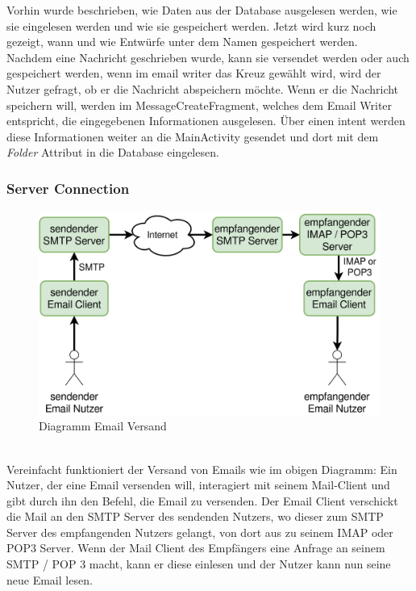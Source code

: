 \documentclass[a4paper,11pt]{article}
\begin{document}

\nohyphenation

Vorhin wurde beschrieben, wie Daten aus der Database ausgelesen werden, wie sie eingelesen werden und wie sie gespeichert werden. Jetzt wird kurz 
noch gezeigt, wann und wie Entwürfe unter dem Namen  gespeichert werden. \\

Nachdem eine Nachricht geschrieben wurde, kann sie versendet werden oder auch gespeichert werden, wenn im \gls{email writer} das Kreuz gewählt wird, wird der Nutzer 
gefragt, ob er die Nachricht abspeichern möchte. Wenn er die Nachricht speichern will, werden im MessageCreateFragment, welches dem Email Writer entspricht, die
eingegebenen Informationen ausgelesen. Über einen \gls{intent} werden diese Informationen weiter an die MainActivity gesendet und dort 
mit dem \textit{Folder} Attribut  in die Database eingelesen.\\

\endgroup

\vspace*{2cm}
\subsubsection{Server Connection}

\begin{figure}[H]
\center
\includegraphics[width=.7\textwidth]{media/connection-diagram.png}
\caption{Diagramm Email Versand}
\end{figure}

\phantom{.} \\ %
Vereinfacht funktioniert der Versand von Emails wie im obigen Diagramm: Ein Nutzer, der eine Email versenden will, interagiert mit seinem Mail-Client und gibt durch ihn den Befehl, die Email zu versenden. Der Email Client verschickt die Mail an den SMTP Server des sendenden Nutzers, wo dieser zum SMTP Server des empfangenden Nutzers gelangt, von dort aus zu seinem IMAP oder POP3 Server. Wenn der Mail Client des Empfängers eine Anfrage an seinem SMTP / POP 3 macht, kann er diese einlesen und der Nutzer kann nun seine neue Email lesen.\\
\end{document}
